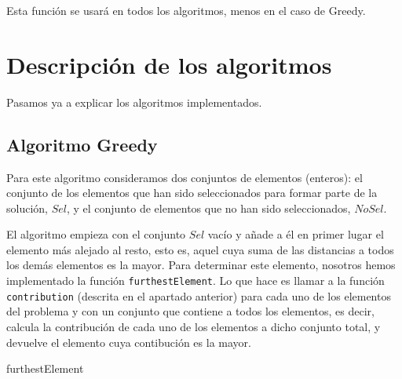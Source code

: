 \documentclass[11pt,a4paper]{article}
\begin{document}
	Esta función se usará en todos los algoritmos, menos en el caso de Greedy. 
	
	\section{Descripción de los algoritmos}
	
	Pasamos ya a explicar los algoritmos implementados. 
		
	\subsection{Algoritmo Greedy}
	
	Para este algoritmo consideramos dos conjuntos de elementos (enteros): el conjunto de los elementos que han sido seleccionados para formar parte de la solución, $Sel$, y el conjunto de elementos que no han sido seleccionados, $NoSel$. 
	
	El algoritmo empieza con el conjunto $Sel$ vacío y añade a él en primer lugar el elemento más alejado al resto, esto es, aquel cuya suma de las distancias a todos los demás elementos es la mayor. Para determinar este elemento, nosotros hemos implementado la función \lstinline|furthestElement|. Lo que hace es llamar a la función \lstinline|contribution| (descrita en el apartado anterior) para cada uno de los elementos del problema y con un conjunto que contiene a todos los elementos, es decir, calcula la contribución de cada uno de los elementos a dicho conjunto total, y devuelve el elemento cuya contibución es la mayor. 

	\begin{algorithm}[H]
		\caption{\sc furthestElement}
	\end{algorithm}
	
\end{document}
